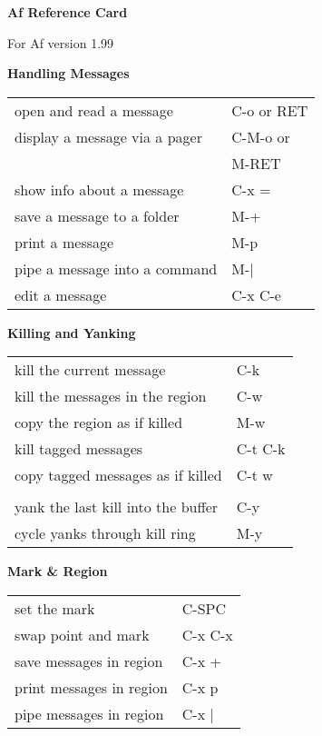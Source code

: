 \documentclass[10pt,a4paper,landscape]{article}
\begin{document}
\begin{multicols}{3}
  \parbox{2.80in}{\begin{center}
      {\huge \textbf{Af Reference Card}}

      {\small {For Af version 1.99}}
    \end{center}}
  \vfill

  {\large \textbf{Handling Messages}}
  \nopagebreak

  \begin{tabular}{p{2.00in}p{0.80in}}
    open and read a message & C-o or RET \\
    display a message via a pager & C-M-o or \\
    & M-RET \\
    show info about a message & C-x = \\
    save a message to a folder & M-+ \\
    print a message & M-p \\
    pipe a message into a command & M-$|$ \\
    edit a message & C-x C-e \\
  \end{tabular}
  \vfill

  {\large \textbf{Killing and Yanking}}
  \nopagebreak

  \begin{tabular}{p{2.00in}p{0.80in}}
    kill the current message & C-k \\
    kill the messages in the region & C-w \\
    copy the region as if killed & M-w \\
    kill tagged messages & C-t C-k \\
    copy tagged messages as if killed & C-t w \\
    & \\
    yank the last kill into the buffer & C-y \\
    cycle yanks through kill ring & M-y \\
  \end{tabular}
  \vfill

  {\large \textbf{Mark \& Region}}
  \nopagebreak

  \begin{tabular}{p{2.00in}p{0.80in}}
    set the mark & C-SPC \\
    swap point and mark & C-x C-x \\
    save messages in region & C-x + \\
    print messages in region & C-x p \\
    pipe messages in region & C-x $|$ \\
  \end{tabular}
  \vfill


\end{multicols}
\end{document}
